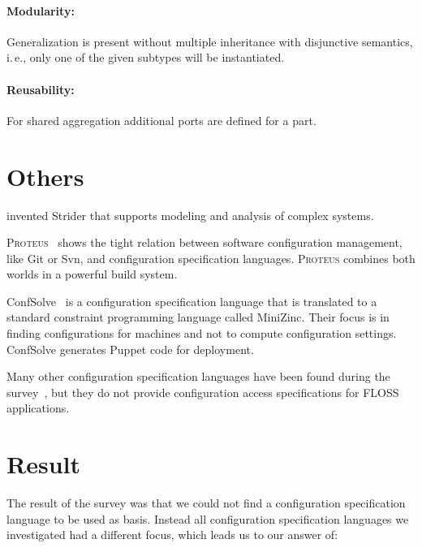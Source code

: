 \paragraph*{Modularity:}
Generalization is present without multiple inheritance with disjunctive semantics, i.\,e., only one of the given subtypes will be instantiated.

\paragraph*{Reusability:}
For shared aggregation additional ports are defined for a part.


\section{Others}

\citet{lock2005strider} invented Strider that supports modeling and analysis of complex systems.

\textsc{Proteus}~\cite{tryggeseth1995modelling} shows the tight relation between software configuration management, like Git or Svn, and configuration specification languages.
\textsc{Proteus} combines both worlds in a powerful build system.

ConfSolve~\cite{hewson2011modelling,hewson2012declarative} is a configuration specification language that is translated to a standard constraint programming language called MiniZinc.
Their focus is in finding configurations for machines and not to compute configuration settings.
ConfSolve generates Puppet code for deployment.

Many other configuration specification languages have been found during the survey~\cite{roll2003towards,pandey2012investigating,hill2011modeling,anderson2002lcfg,deliverable1996tina,lujak2015orcas,sommerville1992configuration,giese2012industrial,huang2007system%
,novak2005automatic%
,gunther2012software,berger2013survey,magableh2010primitive,friedrich1999consistency}, but they do not provide configuration access specifications for FLOSS applications.

\section{Result}

The result of the survey was that we could not find a configuration specification language to be used as basis.
Instead all configuration specification languages we investigated had a different focus, which leads us to our answer of:
\rqBackgroundSpecificationLanguages*


